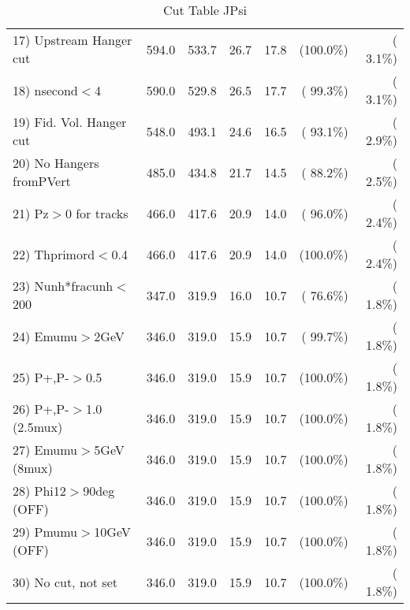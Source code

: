 \begin{table}[h!]
\begin{tabular}{||l||r|r|r|r|r|r||}
 17) Upstream Hanger cut  &        594.0 &        533.7 &         26.7 &         17.8 & (100.0\%) & (  3.1\%) \\
 18) nsecond$<$4          &        590.0 &        529.8 &         26.5 &         17.7 & ( 99.3\%) & (  3.1\%) \\
 19) Fid. Vol. Hanger cut &        548.0 &        493.1 &         24.6 &         16.5 & ( 93.1\%) & (  2.9\%) \\
 20) No Hangers fromPVert &        485.0 &        434.8 &         21.7 &         14.5 & ( 88.2\%) & (  2.5\%) \\
 21) Pz$>$0 for tracks    &        466.0 &        417.6 &         20.9 &         14.0 & ( 96.0\%) & (  2.4\%) \\
 22) Thprimord$<$0.4      &        466.0 &        417.6 &         20.9 &         14.0 & (100.0\%) & (  2.4\%) \\
 23) Nunh*fracunh$<$200   &        347.0 &        319.9 &         16.0 &         10.7 & ( 76.6\%) & (  1.8\%) \\
 24) Emumu$>$2GeV         &        346.0 &        319.0 &         15.9 &         10.7 & ( 99.7\%) & (  1.8\%) \\
 25) P+,P-$>$0.5          &        346.0 &        319.0 &         15.9 &         10.7 & (100.0\%) & (  1.8\%) \\
 26) P+,P-$>$1.0 (2.5mux) &        346.0 &        319.0 &         15.9 &         10.7 & (100.0\%) & (  1.8\%) \\
 27) Emumu$>$5GeV  (8mux) &        346.0 &        319.0 &         15.9 &         10.7 & (100.0\%) & (  1.8\%) \\
 28) Phi12$>$90deg  (OFF) &        346.0 &        319.0 &         15.9 &         10.7 & (100.0\%) & (  1.8\%) \\
 29) Pmumu$>$10GeV  (OFF) &        346.0 &        319.0 &         15.9 &         10.7 & (100.0\%) & (  1.8\%) \\
 30) No cut, not set      &        346.0 &        319.0 &         15.9 &         10.7 & (100.0\%) & (  1.8\%) \\
 \hline
 \hline
 \end{tabular}
 \caption{Cut Table  JPsi     }
 \label{tab-cutcohjpsi-mumu_cohrhop}
 \end{table}
